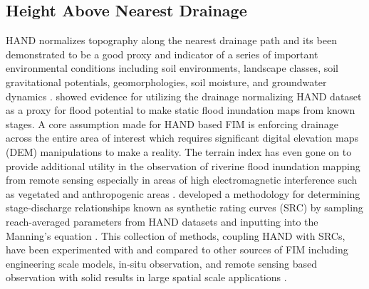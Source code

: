 \subsection{Height Above Nearest Drainage}
%
HAND normalizes topography along the nearest drainage path and its been demonstrated to be a good proxy and indicator of a series of important environmental conditions including soil environments, landscape classes, soil gravitational potentials, geomorphologies, soil moisture, and groundwater dynamics \cite{renno2008hand,nobre2011height}. 
 showed evidence for utilizing the drainage normalizing HAND dataset as a proxy for flood potential to make static flood inundation maps from known stages.
A core assumption made for HAND based FIM is enforcing drainage across the entire area of interest which requires significant digital elevation maps (DEM) manipulations to make a reality.
The terrain index has even gone on to provide additional utility in the observation of riverine flood inundation mapping from remote sensing especially in areas of high electromagnetic interference such as vegetated and anthropogenic areas \cite{aristizabal2020high,shastry2019using,huang2017comparison,twele2016sentinel}.
 developed a methodology for determining stage-discharge relationships known as synthetic rating curves (SRC) by sampling reach-averaged parameters from HAND datasets and inputting into the Manning's equation \cite{gauckler1867etudes,manning1890flow}.
This collection of methods, coupling HAND with SRCs, have been experimented with and compared to other sources of FIM including engineering scale models, in-situ observation, and remote sensing based observation with solid results in large spatial scale applications \cite{godbout2019error,johnson2019integrated,garousi2019terrain,nobre2016hand,afshari2018comparison,zheng2018geoflood,teng2015rapid,teng2017flood,zhang2018comparative}.
%
